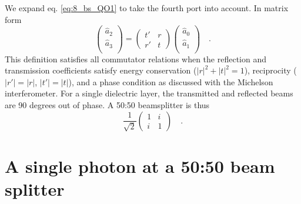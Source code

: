 We expand eq.  \ref{eq:8_bs_QO1} to take the fourth port into account. In matrix form
\begin{equation}
    \begin{pmatrix}
        \hat{a}_2 \\ \hat{a}_3 \\
    \end{pmatrix}
    = 
    \begin{pmatrix}
       t' & r \\ r' & t
    \end{pmatrix}
    \begin{pmatrix}
        \hat{a}_0 \\ \hat{a}_1 \\
    \end{pmatrix} \quad .
\end{equation}
This definition satisfies all commutator relations when the reflection and transmission coefficients satisfy energy conservation ($|r|^2+ |t|^2 = 1$), reciprocity ($|r'| = |r|$, $|t'| = |t|$), and a phase condition as discussed with the Michelson interferometer. For a single dielectric layer, the transmitted and reflected beams are 90 degrees out of phase. A 50:50 beamsplitter is thus
\begin{equation}
\frac{1}{\sqrt{2}}
    \begin{pmatrix}
       1 & i \\ i & 1
    \end{pmatrix} \quad .
\end{equation}


\section{A single photon at a 50:50 beam splitter}

